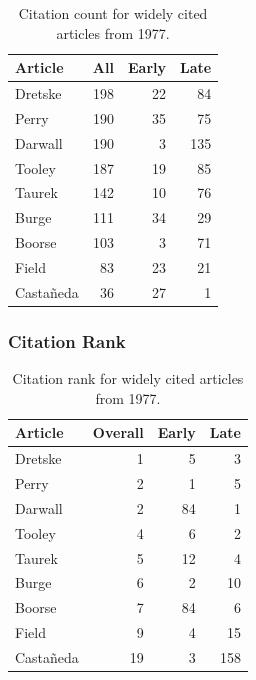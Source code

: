 \documentclass[
  10pt,
  letterpaper,
  DIV=11,
  numbers=noendperiod,
  twoside]{scrartcl}
\begin{document}
\begin{longtable}[]{@{}lrrr@{}}

\caption{\label{tbl-citation-count-1977}Citation count for widely cited
articles from 1977.}

\tabularnewline

\toprule\noalign{}
Article & All & Early & Late \\
\midrule\noalign{}
\endhead
\bottomrule\noalign{}
\endlastfoot
Dretske & 198 & 22 & 84 \\
Perry & 190 & 35 & 75 \\
Darwall & 190 & 3 & 135 \\
Tooley & 187 & 19 & 85 \\
Taurek & 142 & 10 & 76 \\
Burge & 111 & 34 & 29 \\
Boorse & 103 & 3 & 71 \\
Field & 83 & 23 & 21 \\
Castañeda & 36 & 27 & 1 \\

\end{longtable}

\subsubsection*{Citation Rank}\label{sec-rank-1977}

\begin{longtable}[]{@{}lrrr@{}}

\caption{\label{tbl-citation-rank-1977}Citation rank for widely cited
articles from 1977.}

\tabularnewline

\toprule\noalign{}
Article & Overall & Early & Late \\
\midrule\noalign{}
\endhead
\bottomrule\noalign{}
\endlastfoot
Dretske & 1 & 5 & 3 \\
Perry & 2 & 1 & 5 \\
Darwall & 2 & 84 & 1 \\
Tooley & 4 & 6 & 2 \\
Taurek & 5 & 12 & 4 \\
Burge & 6 & 2 & 10 \\
Boorse & 7 & 84 & 6 \\
Field & 9 & 4 & 15 \\
Castañeda & 19 & 3 & 158 \\

\end{longtable}
\end{document}
